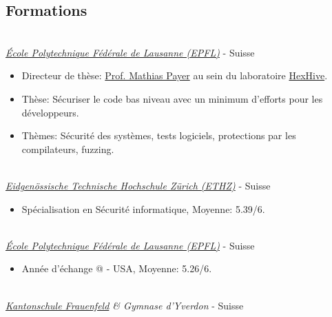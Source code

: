 \documentclass[mm, 11pt]{simple_style}
\begin{document}
\begin{resume}
\section{Formations}

\\
\textsl{\href{https://ic.epfl.ch/en}{\'Ecole Polytechnique F\'ed\'erale de Lausanne (EPFL)}} - Suisse
\begin{itemize}
  \item Directeur de thèse: \href{https://nebelwelt.net/}{Prof. Mathias Payer} au sein du laboratoire \href{https://hexhive.epfl.ch}{HexHive}.
  \item Thèse: Sécuriser le code bas niveau avec un minimum d'efforts pour les développeurs.
  \item Thèmes: Sécurité des systèmes, tests logiciels, protections par les compilateurs, fuzzing. 
\end{itemize}


\\
\textsl{\href{https://www.inf.ethz.ch/}{Eidgen\"ossische Technische Hochschule Z\"urich (ETHZ)}} - Suisse

\begin{itemize}
  \item  Spécialisation en Sécurité informatique, Moyenne: 5.39/6.
\end{itemize}
\\
\textsl{\href{https://ic.epfl.ch/en}{\'Ecole Polytechnique F\'ed\'erale de Lausanne (EPFL)}} - Suisse

\begin{itemize}
  \item Année d'échange @
 - USA, Moyenne: 5.26/6.
\end{itemize}
\\
\textsl{\href{https://www.kanti-frauenfeld.ch/}{Kantonschule Frauenfeld} \& Gymnase d'Yverdon} - Suisse


\end{resume}
\end{document}
